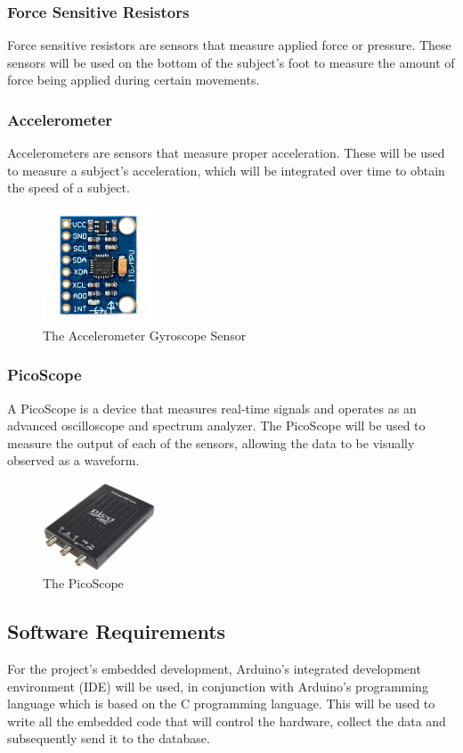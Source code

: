 \subsubsection{Force Sensitive Resistors}
Force sensitive resistors are sensors that measure applied force or pressure. These sensors will be used on the bottom of the subject’s foot to measure the amount of force being applied during certain movements.
\subsubsection{Accelerometer}
Accelerometers are sensors that measure proper acceleration. These will be used to measure a subject’s acceleration, which will be integrated over time to obtain the speed of a subject. 
\begin{figure}[htbp]
\centering
\includegraphics[width=0.3\textwidth]{Project_Proposal/figs/accelerometer.jpg}
\caption{The Accelerometer Gyroscope Sensor \cite{9}}
\label{fig:gyro}
\end{figure}
\newline
\subsubsection{PicoScope}
A PicoScope is a device that measures real-time signals and operates as an advanced oscilloscope and spectrum analyzer. The PicoScope will be used to measure the output of each of the sensors, allowing the data to be visually observed as a waveform.
\begin{figure}[htbp]
\centering
\includegraphics[width=0.3\textwidth]{Project_Proposal/figs/PicoScope.png}
\caption{The PicoScope\cite{10}}
\label{fig:Pico}
\end{figure}
\subsection{Software Requirements}
For the project’s embedded development, Arduino’s integrated development environment (IDE) will be used, in conjunction with Arduino’s programming language which is based on the C programming language. This will be used to write all the embedded code that will control the hardware, collect the data and subsequently send it to the database. 

